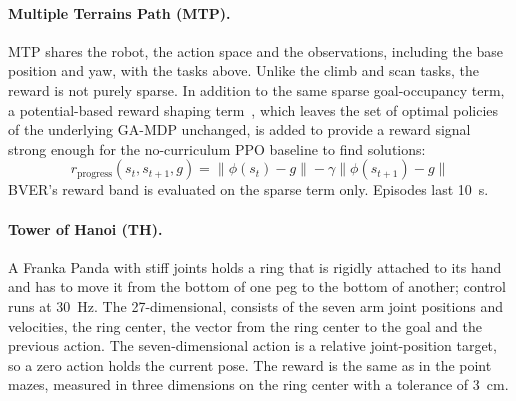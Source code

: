 \paragraph{Multiple Terrains Path (MTP).}
MTP shares the robot, the action space and the observations, including the base position and yaw, with the tasks above.  Unlike the climb and scan tasks, the reward is not purely sparse. In addition to the same sparse goal-occupancy term, a potential-based reward shaping term~\citep{ng1999policy}, which leaves the set of optimal policies of the underlying GA-MDP unchanged, is added to provide a reward signal strong enough for the no-curriculum PPO baseline to find solutions:
\begin{equation*}
    r_{\mathrm{progress}}(s_t, s_{t+1}, g) = \lVert \phi(s_t) - g \rVert - \gamma \lVert \phi(s_{t+1}) - g \rVert
\end{equation*}
BVER's reward band is evaluated on the sparse term only. Episodes last \SI{10}{\second}.

\paragraph{Tower of Hanoi (TH).}
A Franka Panda with stiff joints holds a ring that is rigidly attached to its hand and has to move it from the bottom of one peg to the bottom of another; control runs at \SI{30}{\hertz}. The 27-dimensional, consists of the seven arm joint positions and velocities, the ring center, the vector from the ring center to the goal and the previous action. The seven-dimensional action is a relative joint-position target, so a zero action holds the current pose. The reward is the same as in the point mazes, measured in three dimensions on the ring center with a tolerance of \SI{3}{\centi\meter}.


